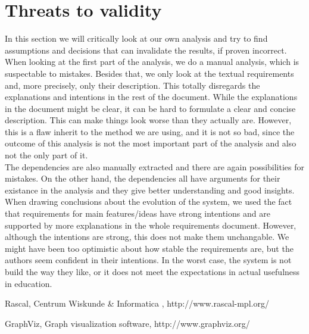 \documentclass[a4paper,11pt]{article}
\begin{document}
	\section{Threats to validity}
		In this section we will critically look at our own analysis and try to find assumptions and decisions that can invalidate the results, if proven incorrect. \\
		When looking at the first part of the analysis, we do a manual analysis, which is suspectable to mistakes. Besides that, we only look at the textual requirements and, more precisely, only their description. This totally disregards the explanations and intentions in the rest of the document. While the explanations in the document might be clear, it can be hard to formulate a clear and concise description. This can make things look worse than they actually are. However, this is a flaw inherit to the method we are using, and it is not so bad, since the outcome of this analysis is not the most important part of the analysis and also not the only part of it. \\
		The dependencies are also manually extracted and there are again possibilities for mistakes. On the other hand, the dependencies all have arguments for their existance in the analysis and they give better understanding and good insights. \\
		When drawing conclusions about the evolution of the system, we used the fact that requirements for main features/ideas have strong intentions and are supported by more explanations in the whole requirements document. However, although the intentions are strong, this does not make them unchangable. We might have been too optimistic about how stable the requirements are, but the authors seem confident in their intentions. In the worst case, the system is not build the way they like, or it does not meet the expectations in actual usefulness in education. 

	\begin{thebibliography}{9}
			Rascal, Centrum Wiskunde \& Informatica , http://www.rascal-mpl.org/

			GraphViz, Graph visualization software, http://www.graphviz.org/

	\end{thebibliography}
\end{document}
